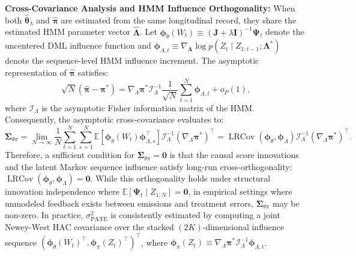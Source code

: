 \documentclass[twoside]{article}
\theoremstyle{definition}
\newcommand{\E}{\mathbb{E}}
\begin{document}
\textbf{Cross-Covariance Analysis and HMM Influence Orthogonality:}
When both $\hat{\boldsymbol{\theta}}_\lambda$ and $\hat{\boldsymbol{\pi}}$ are estimated from the same longitudinal record, they share the estimated HMM parameter vector $\hat{\boldsymbol{\Lambda}}$. Let $\boldsymbol{\phi}_\theta(W_t) \equiv (\boldsymbol{J} + \lambda \boldsymbol{I})^{-1} \boldsymbol{\Psi}_t$ denote the uncentered DML influence function and $\boldsymbol{\phi}_{\Lambda, t} \equiv \nabla_{\boldsymbol{\Lambda}} \log p(Z_t \mid Z_{1:t-1}; \boldsymbol{\Lambda}^*)$ denote the sequence-level HMM influence increment. The asymptotic representation of $\hat{\boldsymbol{\pi}}$ satisfies:
\begin{equation}
    \sqrt{N}(\hat{\boldsymbol{\pi}} - \boldsymbol{\pi}^*) = \nabla_\Lambda \boldsymbol{\pi}^* \mathcal{I}_\Lambda^{-1} \frac{1}{\sqrt{N}} \sum_{t=1}^N \boldsymbol{\phi}_{\Lambda, t} + o_P(1),
\end{equation}
where $\mathcal{I}_\Lambda$ is the asymptotic Fisher information matrix of the HMM. Consequently, the asymptotic cross-covariance evaluates to:
\begin{equation}
    \boldsymbol{\Sigma}_{\theta\pi} = \lim_{N \to \infty} \frac{1}{N} \sum_{t=1}^N \sum_{s=1}^N \E\left[ \boldsymbol{\phi}_\theta(W_t) \boldsymbol{\phi}_{\Lambda, s}^\top \right] \mathcal{I}_\Lambda^{-1} (\nabla_\Lambda \boldsymbol{\pi}^*)^\top = \operatorname{LRCov}(\boldsymbol{\phi}_\theta, \boldsymbol{\phi}_\Lambda) \mathcal{I}_\Lambda^{-1} (\nabla_\Lambda \boldsymbol{\pi}^*)^\top.
\end{equation}
Therefore, a sufficient condition for $\boldsymbol{\Sigma}_{\theta\pi} = \mathbf{0}$ is that the causal score innovations and the latent Markov sequence influence satisfy long-run cross-orthogonality: $\operatorname{LRCov}(\boldsymbol{\phi}_\theta, \boldsymbol{\phi}_\Lambda) = \mathbf{0}$. While this orthogonality holds under structural innovation independence where $\E[\boldsymbol{\Psi}_t \mid Z_{1:N}] = \mathbf{0}$, in empirical settings where unmodeled feedback exists between emissions and treatment errors, $\boldsymbol{\Sigma}_{\theta\pi}$ may be non-zero. In practice, $\sigma_{\mathrm{PATE}}^2$ is consistently estimated by computing a joint Newey-West HAC covariance over the stacked $(2K)$-dimensional influence sequence $(\boldsymbol{\phi}_\theta(W_t)^\top, \boldsymbol{\phi}_\pi(Z_t)^\top)^\top$, where $\boldsymbol{\phi}_\pi(Z_t) \equiv \nabla_\Lambda \boldsymbol{\pi}^* \mathcal{I}_\Lambda^{-1} \boldsymbol{\phi}_{\Lambda, t}$.
\end{document}

